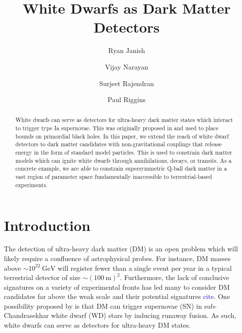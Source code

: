 \documentclass[twocolumn,showpacs,preprintnumbers,amsmath,amssymb,prd]{revtex4}
\newcommand{\GeV}{\text{GeV}}
\begin{document}
\title{White Dwarfs as Dark Matter Detectors}

\author{Ryan Janish}

\author{Vijay Narayan}

\author{Surjeet Rajendran}

\author{Paul Riggins}

\begin{abstract}

White dwarfs can serve as detectors for ultra-heavy dark matter states which interact to trigger type Ia supernovae.
This was originally proposed in \cite{Graham:2015apa} and used to place bounds on primordial black holes.
In this paper, we extend the reach of white dwarf detectors to dark matter candidates with non-gravitational couplings that release energy in the form of standard model particles.
This is used to constrain dark matter models which can ignite white dwarfs through annihilations, decays, or transits.
As a concrete example, we are able to constrain supersymmetric Q-ball dark matter in a vast region of parameter space fundamentally inaccessible to terrestrial-based experiments.


\end{abstract}
\maketitle

\section{Introduction}
\label{sec:Introduction}

The detection of ultra-heavy dark matter (DM) is an open problem which will likely require a confluence of astrophysical probes.
For instance, DM masses above $\sim 10^{22} ~\GeV$ will register fewer than a single event per year in a typical terrestrial detector of size $\sim (100 ~\text{m})^2$.
Furthermore, the lack of conclusive signatures on a variety of experimental fronts has led many to consider DM candidates far above the weak scale and their potential signatures \textcolor{blue}{cite}.
One possibility proposed by \cite{Graham:2015apa} is that DM can trigger supernovae (SN) in sub-Chandrasekhar white dwarf (WD) stars by inducing runaway fusion.
As such, white dwarfs can serve as detectors for ultra-heavy DM states.
\end{document}
